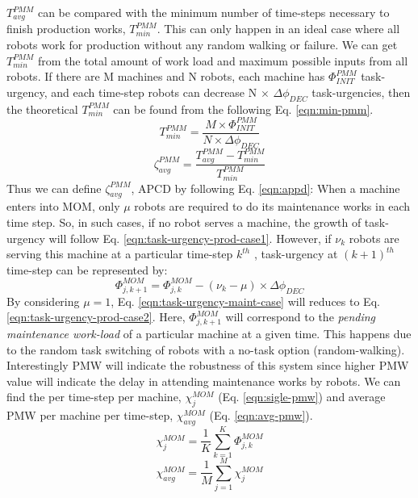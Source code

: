 \documentclass[final,5p,times,twocolumn]{elsarticle}
\begin{document}
$T_{avg}^{PMM}$ can be compared with the minimum number of time-steps necessary to finish production works, $T_{min}^{PMM}$. This can only happen in an ideal case where all robots work for production without any random walking or failure. We can get $T_{min}^{PMM}$ from the total amount of work load and maximum possible inputs from all robots. If there are M machines and N robots, each machine has $\Phi_{INIT}^{PMM}$ task-urgency, and each time-step robots can decrease N $\times$ $\Delta \phi_{DEC}$ task-urgencies, then the theoretical $T_{min}^{PMM}$ can be found from the following Eq. \ref{eqn:min-pmm}.
%
\begin{equation}
T_{min}^{PMM} = \frac{M \times \Phi_{INIT}^{PMM}}{N \times \Delta \phi_{DEC}} 
\label{eqn:min-pmm}
\end{equation}
\begin{equation}
\zeta_{avg}^{PMM} = \frac{T_{avg}^{PMM} - T_{min}^{PMM}}{T_{min}^{PMM}} 
\label{eqn:appd}
\end{equation}
Thus we can define $\zeta_{avg}^{PMM}$, \acf{APCD} by following Eq. \ref{eqn:appd}:
When a machine enters into MOM, only $\mu$ robots are required to do its maintenance works in each time step. So, in such cases, if no robot serves a machine, the growth of task-urgency will follow Eq. \ref{eqn:task-urgency-prod-case1}. However, if $\nu_{k}$ robots are serving this machine at a particular time-step $k^{th}$ , task-urgency at $(k+1)^{th}$ time-step can be represented by:
\begin{equation}
\Phi_{j, k+1}^{MOM} = \Phi_{j, k}^{MOM}- (\nu_{k} - \mu) \times \Delta \phi_{DEC}
\label{eqn:task-urgency-maint-case}
\end{equation}
By considering $\mu = 1$, Eq. \ref{eqn:task-urgency-maint-case} will reduces to Eq. \ref{eqn:task-urgency-prod-case2}. Here, $\Phi_{j, k+1}^{MOM}$ will correspond to the {\em pending maintenance work-load} of a particular machine at a given time. This happens due to the random task switching of robots with a no-task option (random-walking). Interestingly PMW will indicate the robustness of this system since higher PMW value will indicate the delay in attending maintenance works by robots. We can find the  per time-step per machine, $\chi_{j}^{MOM}$ (Eq. \ref{eqn:sigle-pmw}) and average PMW per machine per time-step, $\chi_{avg}^{MOM}$ (Eq. \ref{eqn:avg-pmw}).
\begin{equation}
\chi_{j}^{MOM}= \frac{1}{K} \sum_{k=1}^{K} \Phi_{j, k}^{MOM}
\label{eqn:sigle-pmw}
\end{equation}
\begin{equation}
\chi_{avg}^{MOM}= \frac{1}{M} \sum_{j=1}^{M} {\chi_{j}^{MOM}}
\label{eqn:avg-pmw}
\end{equation}
\end{document}
